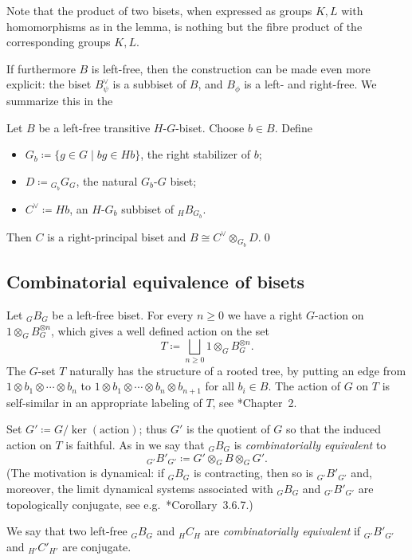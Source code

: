 \documentclass{amsart}
\begin{document}
Note that the product of two bisets, when expressed as groups $K,L$ with
homomorphisms as in the lemma, is nothing but the fibre product of the
corresponding groups $K,L$.

If furthermore $B$ is left-free, then the construction can be made
even more explicit: the biset $B_\psi^\vee$ is a subbiset of $B$, and
$B_\phi$ is a left- and right-free. We summarize this in the
\begin{prop}\label{prop:DecompOfBisets}
  Let $B$ be a left-free transitive $H$-$G$-biset. Choose $b\in B$.
  Define
  \begin{itemize}
  \item $G_b\coloneqq\{g\in G\mid b g\in H b\}$, the right stabilizer of $b$;
  \item $D\coloneqq{}_{G_b}G_G$, the natural $G_b$-$G$ biset;
  \item $C^\vee\coloneqq H b$, an $H$-$G_b$ subbiset of ${}_H B_{G_b}$.
  \end{itemize}
  Then $C$ is a right-principal biset and $B\cong C^\vee\otimes_{G_b}
  D$.\qed
\end{prop}

\subsection{Combinatorial equivalence of bisets}\label{ss:combequiv}
Let ${}_GB_G$ be a left-free biset. For every $n\ge 0$ we have a right
$G$-action on $1\otimes_{G}B^{\otimes n}_G$, which gives a well defined
action on the set
\[T\coloneqq \bigsqcup_{n\ge0} 1\otimes_{G}B^{\otimes n}_G.
\]
The $G$-set $T$ naturally has the structure of a rooted tree, by putting an
edge from $1\otimes b_1\otimes\cdots\otimes b_n$ to $1\otimes
b_1\otimes\cdots\otimes b_n\otimes b_{n+1}$ for all $b_i\in B$. The action
of $G$ on $T$ is self-similar in an appropriate labeling of $T$, see
\cite{nekrashevych:ssg}*{Chapter~2}.

Set $G'\coloneqq G/\ker(\text{action})$; thus $G'$ is the
quotient of $G$ so that the induced action on $T$ is faithful. As in
\cite{nekrashevych:combinatorialmodels} we say that ${}_GB_G$ is
\emph{combinatorially equivalent} to
\[_{G'}B'_{G'} \coloneqq G' \otimes_{G} B\otimes_G G'.
\]
(The motivation is dynamical: if ${}_GB_G$ is contracting, then so is
${}_{G'}B'_{G'}$ and, moreover, the limit dynamical systems associated
with ${}_GB_G$ and ${}_{G'}B'_{G'}$ are topologically conjugate, see
e.g.~\cite{nekrashevych:ssg}*{Corollary~3.6.7}.)

We say that two left-free ${}_GB_G$ and ${}_H C_H$ are \emph{combinatorially
  equivalent} if ${}_{G'}B'_{G'}$ and ${}_{H'}C'_{H'}$ are conjugate.
\end{document}
